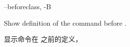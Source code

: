 \begin{docKey}
{--beforeclass, -B}{}%
{}%

Show definition of the command before .

显示命令在  之前的定义，
\end{docKey}







